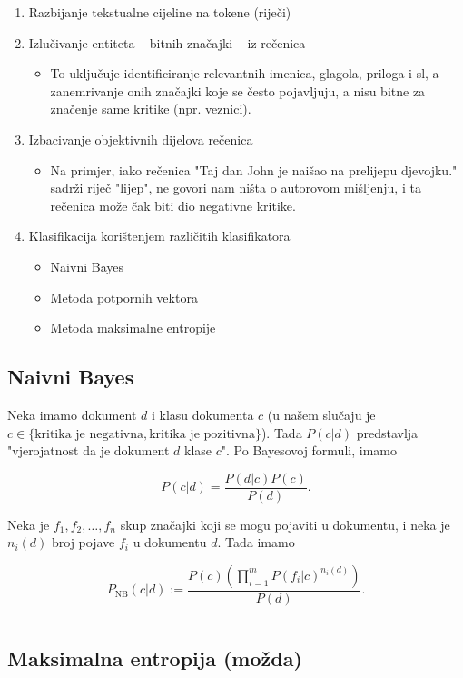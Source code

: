 \documentclass[12pt,a4paper,titlepage]{article}
\begin{document}
\begin{enumerate}
  \item Razbijanje tekstualne cijeline na tokene (riječi)
  \item Izlučivanje entiteta -- bitnih značajki -- iz rečenica
    \begin{itemize}
      \item To uključuje identificiranje relevantnih imenica, glagola, priloga i sl, a zanemrivanje onih značajki koje se često pojavljuju, a nisu bitne za značenje same kritike (npr. veznici).
    \end{itemize}
  \item Izbacivanje objektivnih dijelova rečenica
    \begin{itemize}
      \item Na primjer, iako rečenica "Taj dan John je naišao na prelijepu djevojku." sadrži riječ "lijep", ne govori nam ništa o autorovom mišljenju, i ta rečenica može čak biti dio negativne kritike.
    \end{itemize}
  \item Klasifikacija korištenjem različitih klasifikatora
    \begin{itemize}
      \item Naivni Bayes
      \item Metoda potpornih vektora
      \item Metoda maksimalne entropije
    \end{itemize}
\end{enumerate}

\subsection{Naivni Bayes}

Neka imamo dokument $d$ i klasu dokumenta $c$ (u našem slučaju je $c \in \{\text{kritika je negativna}, \text{kritika je pozitivna}\}$). Tada $P(c|d)$ predstavlja "vjerojatnost da je dokument $d$ klase $c$". Po Bayesovoj formuli, imamo

\[
  P(c|d) = \frac{P(d|c)P(c)}{P(d)}.
\]

Neka je $f_1, f_2, \ldots, f_n$ skup značajki koji se mogu pojaviti u dokumentu, i neka je $n_i(d)$ broj pojave $f_i$ u dokumentu $d$. Tada imamo

\[
  P_\text{NB}(c|d) := \frac{P(c)\left(\prod_{i=1}^{m} P(f_i|c)^{n_i(d)}\right)}{P(d)}.
\]


\[
\]

\subsection{Maksimalna entropija (možda)}
\end{document}
